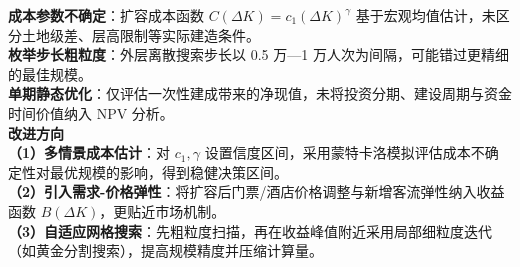 \noindent\textbf{成本参数不确定}：扩容成本函数 $C(\Delta K)=c_1(\Delta K)^{\gamma}$ 基于宏观均值估计，未区分土地级差、层高限制等实际建造条件。\\[2pt]
\noindent\textbf{枚举步长粗粒度}：外层离散搜索步长以 0.5 万—1 万人次为间隔，可能错过更精细的最佳规模。\\[2pt]
\noindent\textbf{单期静态优化}：仅评估一次性建成带来的净现值，未将投资分期、建设周期与资金时间价值纳入 NPV 分析。\\[6pt]

\noindent\textbf{改进方向}\\
\noindent\textbf{（1）多情景成本估计}：对 $c_1,\gamma$ 设置信度区间，采用蒙特卡洛模拟评估成本不确定性对最优规模的影响，得到稳健决策区间。\\
\noindent\textbf{（2）引入需求-价格弹性}：将扩容后门票/酒店价格调整与新增客流弹性纳入收益函数 $B(\Delta K)$，更贴近市场机制。\\
\noindent\textbf{（3）自适应网格搜索}：先粗粒度扫描，再在收益峰值附近采用局部细粒度迭代（如黄金分割搜索），提高规模精度并压缩计算量。\\
